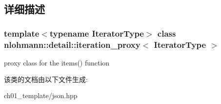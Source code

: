 \subsection{详细描述}
\subsubsection*{template$<$typename Iterator\+Type$>$\newline
class nlohmann\+::detail\+::iteration\+\_\+proxy$<$ Iterator\+Type $>$}

proxy class for the items() function 

该类的文档由以下文件生成\+:\begin{DoxyCompactItemize}
\item 
ch01\+\_\+template/json.\+hpp\end{DoxyCompactItemize}
